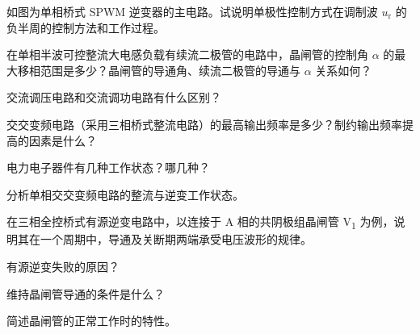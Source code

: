 \documentclass[电力电子]{subfiles}
\begin{document}
\begin{ti}[10 分]
	如图为单相桥式 SPWM 逆变器的主电路。试说明单极性控制方式在调制波 $u_{\mathrm{r}}$ 的负半周的控制方法和工作过程。
\end{ti}

\begin{ti}[5 分]
	在单相半波可控整流大电感负载有续流二极管的电路中，晶闸管的控制角 $\alpha$ 的最大移相范围是多少？晶闸管的导通角、续流二极管的导通与 $\alpha$ 关系如何？
\end{ti}

\begin{ti}[5 分]
	交流调压电路和交流调功电路有什么区别？
\end{ti}

\begin{ti}[5 分]
	交交变频电路（采用三相桥式整流电路）的最高输出频率是多少？制约输出频率提高的因素是什么？
\end{ti}

\begin{ti}[5 分]
	电力电子器件有几种工作状态？哪几种？
\end{ti}

\begin{ti}[10 分]
	分析单相交交变频电路的整流与逆变工作状态。
\end{ti}

\begin{ti}[5 分]
	在三相全控桥式有源逆变电路中，以连接于 A 相的共阴极组晶闸管 V\textsubscript{1} 为例，说明其在一个周期中，导通及关断期两端承受电压波形的规律。
\end{ti}

\begin{ti}[5 分]
	有源逆变失败的原因？
\end{ti}

\begin{ti}[5 分]
	维持晶闸管导通的条件是什么？
\end{ti}

\begin{ti}[5 分]
	简述晶闸管的正常工作时的特性。
\end{ti}
\end{document}
